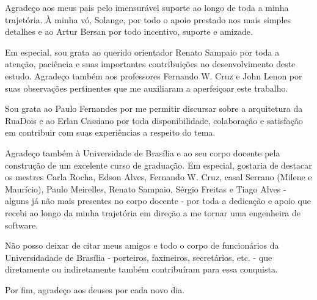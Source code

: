 \begin{agradecimentos}
    Agradeço aos meus pais pelo imensurável suporte ao longo de toda a minha trajetória.
    À minha vó, Solange, por todo o apoio prestado nos mais simples detalhes e ao Artur
    Bersan por todo incentivo, suporte e amizade.

    Em especial, sou grata ao querido orientador Renato Sampaio por toda a atenção, paciência
    e suas importantes contribuições no desenvolvimento deste estudo.
    Agradeço também aos professores Fernando W. Cruz e John Lenon por suas observações pertinentes
    que me auxiliaram a aperfeiçoar este trabalho.

    Sou grata ao Paulo Fernandes por me permitir discursar sobre a arquitetura da RuaDois e ao
    Erlan Cassiano por toda disponibilidade, colaboração e satisfação em contribuir com suas
    experiências a respeito do tema.

    Agradeço também à Universidade de Brasília e ao seu corpo docente pela construção de um
    excelente curso de graduação. Em especial, gostaria de destacar os mestres Carla Rocha, Edson Alves,
    Fernando W. Cruz, casal Serrano (Milene e Maurício), Paulo Meirelles, Renato Sampaio, Sérgio Freitas
    e Tiago Alves - alguns já não mais presentes no corpo docente - por toda a dedicação e apoio que
    recebi ao longo da minha trajetória em direção a me tornar uma engenheira de software.

    Não posso deixar de citar meus amigos e todo o corpo de funcionários da Universidadade de
    Brasília - porteiros, faxineiros, secretários, etc. - que diretamente ou indiretamente também
    contribuíram para essa conquista.

    Por fim, agradeço aos deuses por cada novo dia.
\end{agradecimentos}
